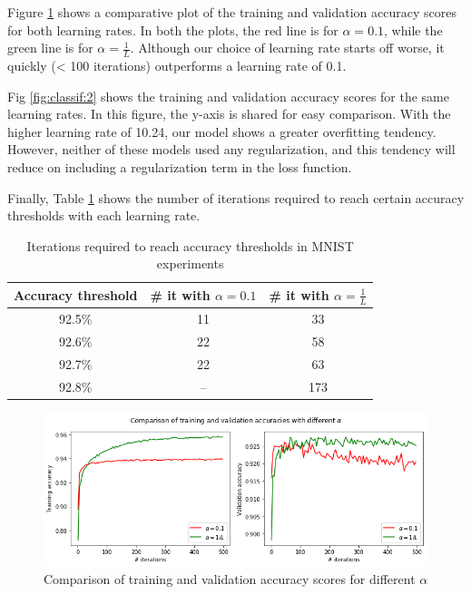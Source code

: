 \documentclass{article}
\begin{document}
Figure \ref{fig:classif:1} shows a comparative plot of the training and validation accuracy scores for both learning rates. In both the plots, the red line is for $\alpha = 0.1$, while the green line is for $\alpha = \frac{1}{L}$. Although our choice of learning rate starts off worse, it quickly (< 100 iterations) outperforms a learning rate of 0.1. 

Fig \ref{fig:classif:2} shows the training and validation accuracy scores for the same learning rates. In this figure, the y-axis is shared for easy comparison. With the higher learning rate of 10.24, our model shows a greater overfitting tendency. However, neither of these models used any regularization, and this tendency will reduce on including a regularization term in the loss function.

Finally, Table \ref{tab:classif:4} shows the number of iterations required to reach certain accuracy thresholds with each learning rate.

\begin{table}
    \caption{Iterations required to reach accuracy thresholds in MNIST experiments}
    \centering
    \begin{tabular}{ccc}
        \toprule
        Accuracy threshold & \# it with $\alpha=0.1$ & \# it with $\alpha=\frac{1}{L}$ \\
        \midrule
        92.5\% & 11 & 33 \\
        92.6\% & 22 & 58 \\
        92.7\% & 22 & 63 \\
        92.8\% & -- & 173 \\
        \bottomrule
    \end{tabular}
    \label{tab:classif:4}
\end{table}

\begin{figure}
    \centering
    \includegraphics[scale=0.5]{mnist_acc.png}
    \caption{Comparison of training and validation accuracy scores for different $\alpha$}
    \label{fig:classif:1}
\end{figure}
\end{document}
